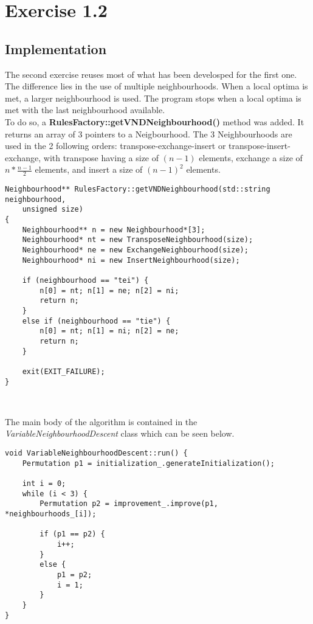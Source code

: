 \section{Exercise 1.2}

\subsection{Implementation}
The second exercise reuses most of what has been develosped for the first one.
The difference lies in the use of multiple neighbourhoods. When a local optima
is met, a larger neighbourhood is used. The program stops when a local optima is
met with the last neighbourhood available.\\

To do so, a \textbf{RulesFactory::getVNDNeighbourhood()} method was added. It
returns an array of 3 pointers to a Neigbourhood. The 3 Neighbourhoods are used
in the 2 following orders: transpose-exchange-insert or transpose-insert-exchange,
with transpose having a size of $(n-1)$ elements, exchange a size of
$n * \frac{n-1}{2}$ elements, and insert a size of $(n-1)^2$ elements.\\

\begin{lstlisting}
Neighbourhood** RulesFactory::getVNDNeighbourhood(std::string neighbourhood,
    unsigned size)
{
    Neighbourhood** n = new Neighbourhood*[3];
    Neighbourhood* nt = new TransposeNeighbourhood(size);
    Neighbourhood* ne = new ExchangeNeighbourhood(size);
    Neighbourhood* ni = new InsertNeighbourhood(size);
    
    if (neighbourhood == "tei") {
        n[0] = nt; n[1] = ne; n[2] = ni;
        return n;
    }
    else if (neighbourhood == "tie") {
        n[0] = nt; n[1] = ni; n[2] = ne;
        return n;
    }
    
    exit(EXIT_FAILURE);
}
\end{lstlisting}
\

The main body of the algorithm is contained in the
\emph{VariableNeighbourhoodDescent} class which can be seen below.\\

\begin{lstlisting}
void VariableNeighbourhoodDescent::run() {
    Permutation p1 = initialization_.generateInitialization();
    
    int i = 0;
    while (i < 3) {
        Permutation p2 = improvement_.improve(p1, *neighbourhoods_[i]);
        
        if (p1 == p2) {
            i++;
        }
        else {
            p1 = p2;
            i = 1;
        }
    }
}
\end{lstlisting}

\newpage
